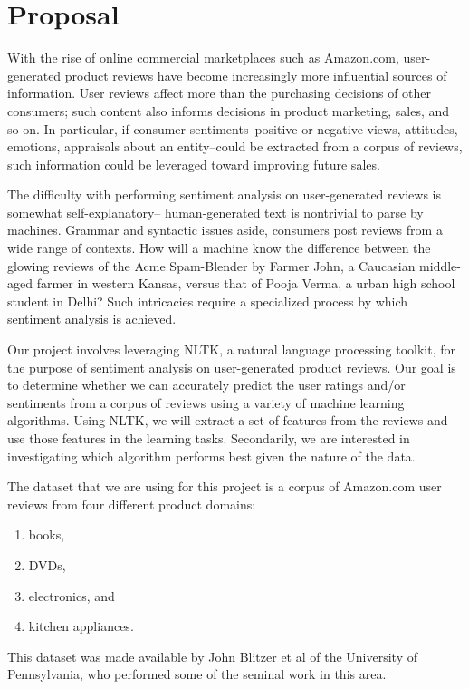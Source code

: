 \section{Proposal}
With the rise of online commercial marketplaces such as Amazon.com,
user-generated product reviews have become increasingly more influential sources of information.
User reviews affect more than the purchasing decisions of other consumers;
such content also informs decisions in product marketing, sales, and so on.
In particular, if consumer sentiments--positive or negative views, attitudes, emotions, appraisals about an entity--could be 
extracted from a corpus of reviews, such information could be leveraged toward improving future sales.

The difficulty with performing sentiment analysis on user-generated reviews is somewhat self-explanatory--
human-generated text is nontrivial to parse by machines. Grammar and syntactic issues aside,
consumers post reviews from a wide range of contexts. How will a machine know the difference
between the glowing reviews of the Acme Spam-Blender by Farmer John, a Caucasian middle-aged farmer in western Kansas,
versus that of Pooja Verma, a urban high school student in Delhi? Such intricacies require
a specialized process by which sentiment analysis is achieved.

Our project involves leveraging NLTK\cite{nltk}, a natural language processing toolkit,
for the purpose of sentiment analysis on user-generated product reviews.
Our goal is to determine whether we can accurately predict the user ratings and/or sentiments
from a corpus of reviews using a variety of machine learning algorithms.
Using NLTK, we will extract a set of features from the reviews and
use those features in the learning tasks.
Secondarily, we are interested in investigating which algorithm performs best given the nature of the data.

The dataset that we are using for this project is a corpus of Amazon.com user reviews from four different product domains:
\begin{enumerate}
\item books,
\item DVDs,
\item electronics, and
\item kitchen appliances.
\end{enumerate}
This dataset was made available by John Blitzer et al of the University of Pennsylvania\cite{blitzer2007biographies},
who performed some of the seminal work in this area.

